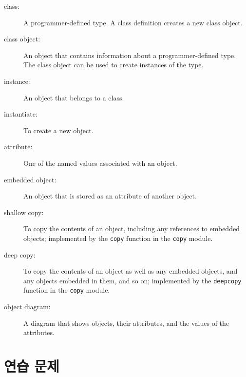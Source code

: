 \documentclass[10pt]{book}
\begin{document}
\begin{description}

\item[class:] A programmer-defined type.  A class definition creates a new
class object.

\item[class object:] An object that contains information about a
programmer-defined type.  The class object can be used to create instances
of the type.

\item[instance:] An object that belongs to a class.

\item[instantiate:] To create a new object.

\item[attribute:] One of the named values associated with an object.

\item[embedded object:] An object that is stored as an attribute
of another object.

\item[shallow copy:] To copy the contents of an object, including
any references to embedded objects;
implemented by the {\tt copy} function in the {\tt copy} module.

\item[deep copy:] To copy the contents of an object as well as any
embedded objects, and any objects embedded in them, and so on;
implemented by the {\tt deepcopy} function in the {\tt copy} module.

\item[object diagram:] A diagram that shows objects, their
attributes, and the values of the attributes.

\end{description}


\section{연습 문제}
\end{document}
